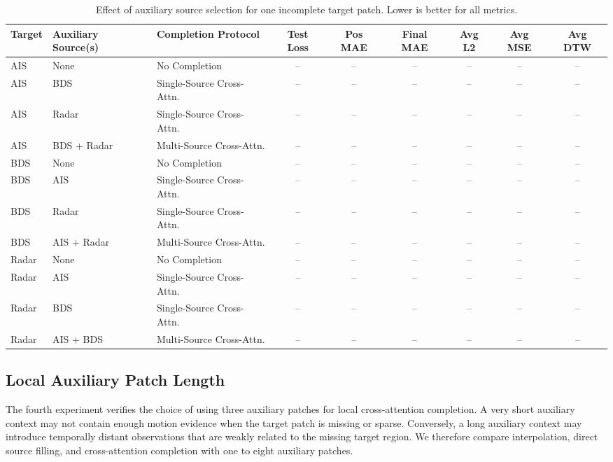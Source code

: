 \begin{table}[t]
    \centering
    \caption{Effect of auxiliary source selection for one incomplete target patch. Lower is better for all metrics.}
    \label{tab:source-completion-analysis}
    \small
    \begin{tabularx}{\textwidth}{llXcccccc}
        \hline
        Target & Auxiliary Source(s) & Completion Protocol & Test Loss & Pos MAE & Final MAE & Avg L2 & Avg MSE & Avg DTW \\
        \hline
        AIS & None & No Completion & -- & -- & -- & -- & -- & -- \\
        AIS & BDS & Single-Source Cross-Attn. & -- & -- & -- & -- & -- & -- \\
        AIS & Radar & Single-Source Cross-Attn. & -- & -- & -- & -- & -- & -- \\
        AIS & BDS + Radar & Multi-Source Cross-Attn. & -- & -- & -- & -- & -- & -- \\
        \hline
        BDS & None & No Completion & -- & -- & -- & -- & -- & -- \\
        BDS & AIS & Single-Source Cross-Attn. & -- & -- & -- & -- & -- & -- \\
        BDS & Radar & Single-Source Cross-Attn. & -- & -- & -- & -- & -- & -- \\
        BDS & AIS + Radar & Multi-Source Cross-Attn. & -- & -- & -- & -- & -- & -- \\
        \hline
        Radar & None & No Completion & -- & -- & -- & -- & -- & -- \\
        Radar & AIS & Single-Source Cross-Attn. & -- & -- & -- & -- & -- & -- \\
        Radar & BDS & Single-Source Cross-Attn. & -- & -- & -- & -- & -- & -- \\
        Radar & AIS + BDS & Multi-Source Cross-Attn. & -- & -- & -- & -- & -- & -- \\
        \hline
    \end{tabularx}
\end{table}

\subsection{Local Auxiliary Patch Length}
\label{subsec:local-patch-length-ablation}

The fourth experiment verifies the choice of using three auxiliary patches for local cross-attention completion. A very short auxiliary context may not contain enough motion evidence when the target patch is missing or sparse. Conversely, a long auxiliary context may introduce temporally distant observations that are weakly related to the missing target region. We therefore compare interpolation, direct source filling, and cross-attention completion with one to eight auxiliary patches.


